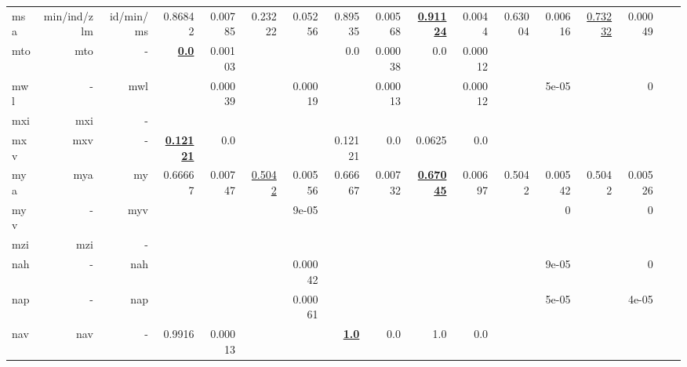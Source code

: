 \documentclass[11pt]{article}
\begin{document}
\begin{table*}[h]
{\begin{tabular}{lrrrrrrrrrrrrrrrr}
msa         & min/ind/zlm         & id/min/ms         & 0.86842         & 0.00785         & 0.23222         & 0.05256         & 0.89535         & 0.00568         & \textbf{\underline{0.91124}}         & 0.0044         & 0.63004         & 0.00616         & \underline{0.73232}         & 0.00049         \\
mto         & mto         & -         & \textbf{\underline{0.0}}         & 0.00103         &          &          & 0.0         & 0.00038         & 0.0         & 0.00012         &          &          &          &          \\
mwl         & -         & mwl         &          & 0.00039         &          & 0.00019         &          & 0.00013         &          & 0.00012         &          & 5e-05         &          & 0         \\
mxi         & mxi         & -         &          &          &          &          &          &          &          &          &          &          &          &          \\
mxv         & mxv         & -         & \textbf{\underline{0.12121}}         & 0.0         &          &          & 0.12121         & 0.0         & 0.0625         & 0.0         &          &          &          &          \\
mya         & mya         & my         & 0.66667         & 0.00747         & \underline{0.5042}         & 0.00556         & 0.66667         & 0.00732         & \textbf{\underline{0.67045}}         & 0.00697         & 0.5042         & 0.00542         & 0.5042         & 0.00526         \\
myv         & -         & myv         &          &          &          & 9e-05         &          &          &          &          &          & 0         &          & 0         \\
mzi         & mzi         & -         &          &          &          &          &          &          &          &          &          &          &          &          \\
nah         & -         & nah         &          &          &          & 0.00042         &          &          &          &          &          & 9e-05         &          & 0         \\
nap         & -         & nap         &          &          &          & 0.00061         &          &          &          &          &          & 5e-05         &          & 4e-05         \\
nav         & nav         & -         & 0.9916         & 0.00013         &          &          & \textbf{\underline{1.0}}         & 0.0         & 1.0         & 0.0         &          &          &          &          \\

\end{tabular}}
\end{table*}
\end{document}
